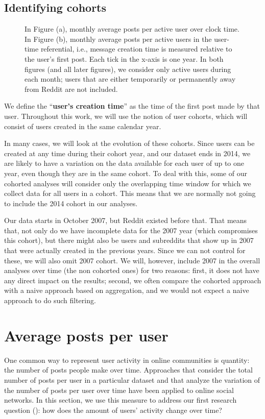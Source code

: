 \subsection{Identifying cohorts}

\begin{figure}[!tb]
\centering
{}
\caption{In Figure (a), monthly average posts per active user over clock time. In Figure (b), monthly average posts per active users in the user-time referential, i.e., message creation time is measured relative to the user's first post.  Each tick in the x-axis is one year.  In both figures (and all later figures), we consider only active users during each month; users that are either temporarily or permanently away from Reddit are not included.}
\label{fig:overall_posts}
\end{figure}

We define the ``\textbf{user's creation time}'' as the time of the first post made by that user.  Throughout this work, we will use the notion of user cohorts, which will consist of users created in the same calendar year.

In many cases, we will look at the evolution of these cohorts. Since users can be created at any time during their cohort year, and our dataset ends in 2014, 
we are likely to have a variation on the data available for each user of up to one year, even though they are in the same cohort.  To deal with this, some of our cohorted analyses will consider only the overlapping time window for which we collect data for all users in a cohort.   This means that we are normally not going to include the 2014 cohort in our analyses.

Our data starts in October 2007, but Reddit existed before that. That means that, not only do we have incomplete data for the 2007 year (which compromises this cohort), but there might also be users and subreddits that show up in 2007 that were actually created in the previous years. Since we can not control for these, we will also omit 2007 cohort. We will, however, include 2007 in the overall analyses over time (the non cohorted ones) for two reasons: first, it does not have any direct impact on the results; second, we often compare the cohorted approach with a naive approach based on aggregation, and we would not expect a naive approach to do such filtering. 


\section{Average posts per user}
One common way to represent user activity in online communities is quantity: the number of posts people make over time. Approaches that consider the total number of posts per user in a particular dataset \cite{Gruhl2004} and that analyze the variation of the number of posts per user over time \cite{Guo2009} have been applied to online social networks.  In this section, we use this measure to address our first research question (\ResearchQuestion\label{rq:activityChange}): how does the amount of users' activity change over time?

